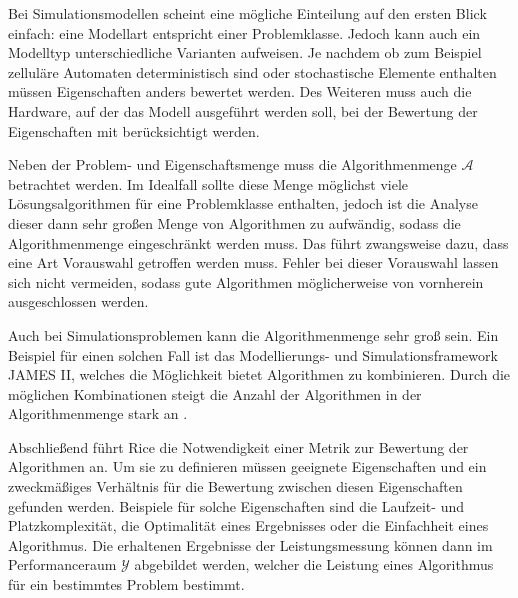 Bei Simulationsmodellen scheint eine mögliche Einteilung auf den ersten Blick einfach: eine Modellart entspricht einer Problemklasse. Jedoch kann auch ein Modelltyp unterschiedliche Varianten aufweisen. Je nachdem ob zum Beispiel zelluläre Automaten deterministisch sind oder stochastische Elemente enthalten müssen Eigenschaften anders bewertet werden. Des Weiteren muss auch die Hardware, auf der das Modell ausgeführt werden soll, bei der Bewertung der Eigenschaften mit berücksichtigt werden.

Neben der Problem- und Eigenschaftsmenge muss die Algorithmenmenge $\mathcal{A}$ betrachtet werden. Im Idealfall sollte diese Menge möglichst viele Lösungsalgorithmen für eine Problemklasse enthalten, jedoch ist die Analyse dieser dann sehr großen Menge von Algorithmen zu aufwändig, sodass die Algorithmenmenge eingeschränkt werden muss. Das führt zwangsweise dazu, dass eine Art Vorauswahl getroffen werden muss. Fehler bei dieser Vorauswahl lassen sich nicht vermeiden, sodass gute Algorithmen möglicherweise von vornherein ausgeschlossen werden. 

Auch bei Simulationsproblemen kann die Algorithmenmenge sehr groß sein. Ein Beispiel für einen solchen Fall ist das Modellierungs- und Simulationsframework JAMES II, welches die Möglichkeit bietet Algorithmen zu kombinieren. Durch die möglichen Kombinationen steigt die Anzahl der Algorithmen in der Algorithmenmenge stark an \cite{ewald10}.

Abschließend führt Rice die Notwendigkeit einer Metrik zur Bewertung der Algorithmen an. Um sie zu definieren müssen geeignete Eigenschaften und ein zweckmäßiges Verhältnis für die Bewertung zwischen diesen Eigenschaften gefunden werden. Beispiele für solche Eigenschaften sind die Laufzeit- und Platzkomplexität, die Optimalität eines Ergebnisses oder die Einfachheit eines Algorithmus. Die erhaltenen Ergebnisse der Leistungsmessung können dann im Performanceraum $\mathcal{Y}$ abgebildet werden, welcher die Leistung eines Algorithmus für ein bestimmtes Problem bestimmt.
 \\


